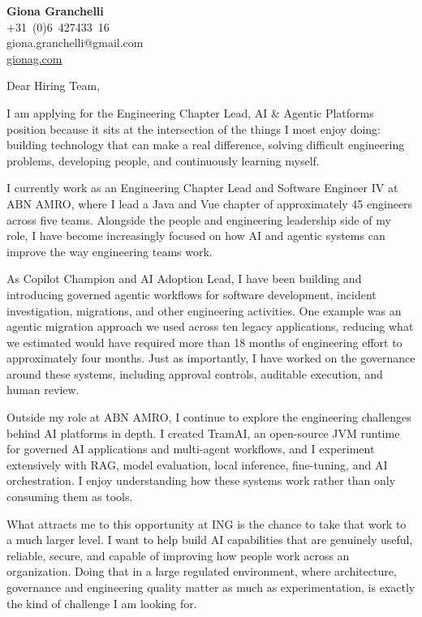 \documentclass[11pt,a4paper]{article}
\begin{document}
\begin{flushright}
\textbf{Giona Granchelli}\\
+31~(0)6~427433~16\\
giona.granchelli@gmail.com\\
\href{https://gionag.com}{gionag.com}
\end{flushright}

\vspace{1.5em}

Dear Hiring Team,

I am applying for the Engineering Chapter Lead, AI \& Agentic Platforms position because it sits at the intersection of the things I most enjoy doing: building technology that can make a real difference, solving difficult engineering problems, developing people, and continuously learning myself.

I currently work as an Engineering Chapter Lead and Software Engineer IV at ABN AMRO, where I lead a Java and Vue chapter of approximately 45 engineers across five teams. Alongside the people and engineering leadership side of my role, I have become increasingly focused on how AI and agentic systems can improve the way engineering teams work.

As Copilot Champion and AI Adoption Lead, I have been building and introducing governed agentic workflows for software development, incident investigation, migrations, and other engineering activities. One example was an agentic migration approach we used across ten legacy applications, reducing what we estimated would have required more than 18 months of engineering effort to approximately four months. Just as importantly, I have worked on the governance around these systems, including approval controls, auditable execution, and human review.

Outside my role at ABN AMRO, I continue to explore the engineering challenges behind AI platforms in depth. I created TramAI, an open-source JVM runtime for governed AI applications and multi-agent workflows, and I experiment extensively with RAG, model evaluation, local inference, fine-tuning, and AI orchestration. I enjoy understanding how these systems work rather than only consuming them as tools.

What attracts me to this opportunity at ING is the chance to take that work to a much larger level. I want to help build AI capabilities that are genuinely useful, reliable, secure, and capable of improving how people work across an organization. Doing that in a large regulated environment, where architecture, governance and engineering quality matter as much as experimentation, is exactly the kind of challenge I am looking for.
\end{document}

